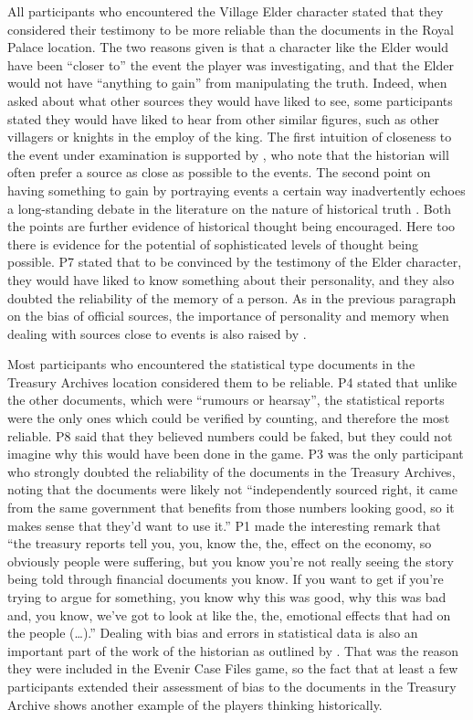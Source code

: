\documentclass{l4proj}
\begin{document}
All participants who encountered the Village Elder character stated that they considered their testimony to be more reliable than the documents in the Royal Palace location. The two reasons given is that a character like the Elder would have been “closer to” the event the player was investigating, and that the Elder would not have “anything to gain” from manipulating the truth. Indeed, when asked about what other sources they would have liked to see, some participants stated they would have liked to hear from other similar figures, such as other villagers or knights in the employ of the king. The first intuition of closeness to the event under examination is supported by \citet{tosh2006pursuit}, who note that the historian will often prefer a source as close as possible to the events. The second point on having something to gain by portraying events a certain way inadvertently echoes a long-standing debate in the literature on the nature of historical truth \citep{carr2018history}. Both the points are further evidence of historical thought being encouraged. Here too there is evidence for the potential of sophisticated levels of thought being possible. P7 stated that to be convinced by the testimony of the Elder character, they would have liked to know something about their personality, and they also doubted the reliability of the memory of a person. As in the previous paragraph on the bias of official sources, the importance of personality and memory when dealing with sources close to events is also raised by \citet{tosh2006pursuit}. 

Most participants who encountered the statistical type documents in the Treasury Archives location considered them to be reliable. P4 stated that unlike the other documents, which were “rumours or hearsay”, the statistical reports were the only ones which could be verified by counting, and therefore the most reliable. P8 said that they believed numbers could be faked, but they could not imagine why this would have been done in the game. P3 was the only participant who strongly doubted the reliability of the documents in the Treasury Archives, noting that the documents were likely not “independently sourced right, it came from the same government that benefits from those numbers looking good, so it makes sense that they'd want to use it.” P1 made the interesting remark that “the treasury reports tell you, you, know the, the, effect on the economy, so obviously people were suffering, but you know you’re not really seeing the story being told through financial documents you know. If you want to get if you're trying to argue for something, you know why this was good, why this was bad and, you know, we've got to look at like the, the, emotional effects that had on the people (…).” Dealing with bias and errors in statistical data is also an important part of the work of the historian as outlined by \citet{tosh2006pursuit}. That was the reason they were included in the Evenir Case Files game, so the fact that at least a few participants extended their assessment of bias to the documents in the Treasury Archive shows another example of the players thinking historically. 
\end{document}
